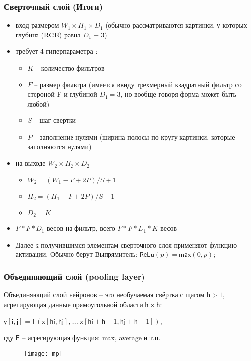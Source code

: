 \documentclass[unicode, notheorems]{beamer}
\begin{document}
\begin{frame}
	\frametitle{Сверточный слой (Итоги)}
	\begin{center}
		\begin{itemize}
			\item вход размером $W_{1} \times H_{1} \times D_{1}$ (обычно рассматриваются картинки, у которых глубина (RGB) равна $D_{1}=3$)
			\item требует 4 гиперпараметра :
				\begin{itemize}
			 		\item $K$ -- количество фильтров
			 		\item $F$ -- размер фильтра (имеется ввиду трехмерный квадратный фильтр со стороной F и глубиной $D_{1}=3$, но вообще говоря форма может быть любой)
			 		\item $S$ -- шаг свертки
			 		\item $P$ -- заполнение нулями (ширина полосы по кругу картинки, которые заполняются нулями)
				\end{itemize}
			\item на выходе $W_{2} \times H_{2} \times D_{2}$
				\begin{itemize}
					\item $W_{2}  = (W_{1} - F + 2P)/S + 1$
					\item $H_{2}  = (H_{1} - F + 2P)/S + 1$
					\item  $D_{2} = K$
				\end{itemize}
			\item $F*F*D_{1}$ весов на фильтр, всего $F*F*D_{1}*K$ весов
			\item Далее к получившимся элементам сверточного слоя применяют функцию активации. Обычно берут  Выпрямитель: $\mathsf{ReLu}(p) = \mathsf{max}(0,p)$;
		\end{itemize}
	\end{center}
\end{frame}
	
\begin{frame}
    \frametitle{Объединяющий слой (pooling layer)}

    Объединяющий слой нейронов -- это необучаемая свёртка с щагом $\mathsf{h} >1$, агрегирующая данные прямоугольной области $\mathsf{h} \times \mathsf{h}$:

    \begin{center}
    	$\mathsf{y}[\mathsf{i},\mathsf{j}] = \mathsf{F}(\mathsf{x}[\mathsf{hi},\mathsf{hj}],\dots,\mathsf{x}[\mathsf{hi} + \mathsf{h} - 1, \mathsf{hj} + \mathsf{h} - 1])$,
    \end{center}
гду $\mathsf{F}$ -- агрегирующая функция: max, average и т.п.

\begin{figure}[h]
	\begin{center}
		\begin{minipage}[h]{0.72\linewidth}
			\texttt{[image: mp]}
		\end{minipage}
	\end{center}
\end{figure}

\end{frame}
\end{document}

